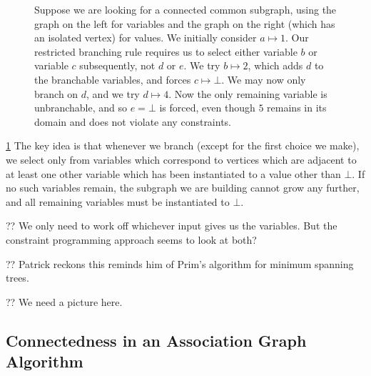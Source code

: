 \documentclass{llncs}
\begin{document}
\begin{figure}[tb]

    \caption{Suppose we are looking for a connected common subgraph, using the graph on the left
        for variables and the graph on the right (which has an isolated vertex) for values. We
        initially consider $a \mapsto 1$. Our restricted branching rule requires us to select either variable
        $b$ or variable $c$ subsequently, not $d$ or $e$. We try $b \mapsto 2$, which adds $d$
        to the branchable variables, and forces $c \mapsto \bot$. We may now only branch on $d$, and
        we try $d \mapsto 4$. Now the only remaining variable is unbranchable, and so $e = \bot$ is forced, even
        though $5$ remains in its domain and does not violate any constraints.}\label{figure:restricted}
\end{figure}

\cref{figure:restricted} The key idea is that whenever we branch (except for the first choice we
make), we select only from variables which correspond to vertices which are adjacent to at least one
other variable which has been instantiated to a value other than $\bot$. If no such variables
remain, the subgraph we are building cannot grow any further, and all remaining variables must be
instantiated to $\bot$.

?? We only need to work off whichever input gives us the variables. But the constraint programming
approach seems to look at both?

?? Patrick reckons this reminds him of Prim's algorithm for minimum spanning trees.

?? We need a picture here.

\subsection{Connectedness in an Association Graph Algorithm}
\end{document}

